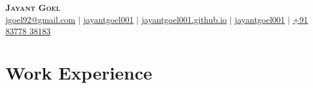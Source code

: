 \documentclass[letterpaper,13pt]{article}
\begin{document}
\begin{center}
    \textbf{\Huge \scshape Jayant Goel} \\[.1in]
    \href{mailto:jgoel92@gmail.com}{{\faEnvelope} \underline{jgoel92@gmail.com}} $|$ 
    \href{https://www.linkedin.com/in/jayantgoel001}{{\faLinkedinSquare} \underline{jayantgoel001}} $|$ 
    \href{https://jayantgoel001.github.io}{{\faLink} \underline{jayantgoel001.github.io}} $|$ \href{https://github.com/jayantgoel001}{{\faGithub} \underline{jayantgoel001}} $|$ 
    \href{tel:+91-8377838183}{{\faPhone} \underline{+91 83778 38183}}
\end{center}

\section{Work Experience}
\end{document}

